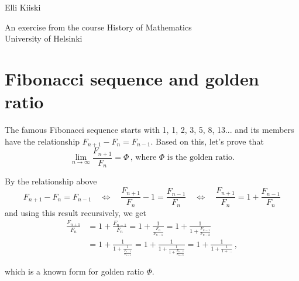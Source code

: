 \documentclass{article}
\begin{document}
{\large
Elli Kiiski
\par
An exercise from the course History of Mathematics\\University of Helsinki
}
\vspace{0.5cm}

\section*{Fibonacci sequence and golden ratio}

The famous Fibonacci sequence starts with 1, 1, 2, 3, 5, 8, 13... and its members have the relationship $F_{n+1}-F_n=F_{n-1}$. Based on this, let's prove that
\begin{equation*}
    \lim_{n\rightarrow\infty}\frac{F_{n+1}}{F_n}=\Phi\,\text{, where $\Phi$ is the golden ratio.}
\end{equation*}

By the relationship above
\begin{equation*}
    F_{n+1}-F_n=F_{n-1} \quad \Leftrightarrow \quad \frac{F_{n+1}}{F_n}-1=\frac{F_{n-1}}{F_n} \quad \Leftrightarrow \quad \frac{F_{n+1}}{F_n}=1+\frac{F_{n-1}}{F_n}
\end{equation*}
and using this result recursively, we get
\begin{align*}
    \frac{F_{n+1}}{F_n} & = 1+\frac{F_{n-1}}{F_n} = 1+\frac{1}{\frac{F_n}{F_{n-1}}} = 1+\frac{1}{1+\frac{F_{n-1}}{F_{n-2}}}\\
    & = 1+\frac{1}{1+\frac{1}{\frac{F_{n-2}}{F_{n-1}}}} = 1+\frac{1}{1+\frac{1}{1+\frac{F_{n-2}}{F_{n-3}}}} = 1+\frac{1}{1+\frac{1}{1+\dots}}\,,
\end{align*}

which is a known form for golden ratio $\Phi$.
\end{document}
